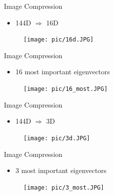 \documentclass[serif, aspectratio=169]{beamer}
\begin{document}
\begin{frame}{Image Compression}
       \begin{itemize}
           \item 144D $\Rightarrow$ 16D
       \end{itemize}
        \begin{figure}[htpb]
            \begin{center}
                \texttt{[image: pic/16d.JPG]}
            \end{center}
        \end{figure}
\end{frame}


\begin{frame}{Image Compression}
       \begin{itemize}
           \item 16 most important eigenvectors
       \end{itemize}
        \begin{figure}[htpb]
            \begin{center}
                \texttt{[image: pic/16\_most.JPG]}
            \end{center}
        \end{figure}
\end{frame}


\begin{frame}{Image Compression}
       \begin{itemize}
           \item 144D $\Rightarrow$ 3D
       \end{itemize}
        \begin{figure}[htpb]
            \begin{center}
                \texttt{[image: pic/3d.JPG]}
            \end{center}
        \end{figure}
\end{frame}


\begin{frame}{Image Compression}
       \begin{itemize}
           \item 3 most important eigenvectors
       \end{itemize}
        \begin{figure}[htpb]
            \begin{center}
                \texttt{[image: pic/3\_most.JPG]}
            \end{center}
        \end{figure}
\end{frame}
\end{document}
